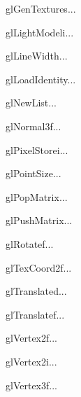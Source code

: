 \begin{funcdesc}{glGenTextures}{...}
\end{funcdesc}

\begin{funcdesc}{glLightModeli}{...}
\end{funcdesc}

\begin{funcdesc}{glLineWidth}{...}
\end{funcdesc}

\begin{funcdesc}{glLoadIdentity}{...}
\end{funcdesc}

\begin{funcdesc}{glNewList}{...}
\end{funcdesc}

\begin{funcdesc}{glNormal3f}{...}
\end{funcdesc}

\begin{funcdesc}{glPixelStorei}{...}
\end{funcdesc}

\begin{funcdesc}{glPointSize}{...}
\end{funcdesc}

\begin{funcdesc}{glPopMatrix}{...}
\end{funcdesc}

\begin{funcdesc}{glPushMatrix}{...}
\end{funcdesc}

\begin{funcdesc}{glRotatef}{...}
\end{funcdesc}

\begin{funcdesc}{glTexCoord2f}{...}
\end{funcdesc}

\begin{funcdesc}{glTranslated}{...}
\end{funcdesc}

\begin{funcdesc}{glTranslatef}{...}
\end{funcdesc}

\begin{funcdesc}{glVertex2f}{...}
\end{funcdesc}

\begin{funcdesc}{glVertex2i}{...}
\end{funcdesc}

\begin{funcdesc}{glVertex3f}{...}
\end{funcdesc}

